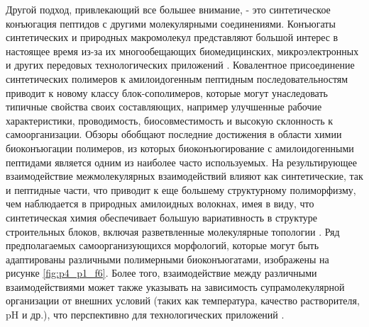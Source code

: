     Другой подход, привлекающий все большее внимание, - это синтетическое конъюгация пептидов с другими молекулярными соединениями. Конъюгаты синтетических и природных макромолекул представляют большой интерес в настоящее время из-за их многообещающих биомедицинских, микроэлектронных и других передовых технологических приложений \cite{borner_strategies_2009,lutz_modern_2008,borner_bioinspired_2007,vandermeulen_peptideprotein_2004,hardy_silk-inspired_2009,schlaad_block_2003}. Ковалентное присоединение синтетических полимеров к амилоидогенным пептидным последовательностям приводит к новому классу блок-сополимеров, которые могут унаследовать типичные свойства своих составляющих, например улучшенные рабочие характеристики, проводимость, биосовместимость и высокую склонность к самоорганизации. Обзоры \cite{borner_strategies_2009,lutz_modern_2008,borner_bioinspired_2007,vandermeulen_peptideprotein_2004} обобщают последние достижения в области химии биоконъюгации полимеров, из которых биоконъюгирование с амилоидогенными пептидами является одним из наиболее часто используемых. На результирующее взаимодействие межмолекулярных взаимодействий влияют как синтетические, так и пептидные части, что приводит к еще большему структурному полиморфизму, чем наблюдается в природных амилоидных волокнах, имея в виду, что синтетическая химия обеспечивает большую вариативность в структуре строительных блоков, включая разветвленные молекулярные топологии \cite{eckhardt_rational_2005}. Ряд предполагаемых самоорганизующихся морфологий, которые могут быть адаптированы различными полимерными биоконъюгатами, изображены на рисунке \ref{fig:p4_p1_f6}. Более того, взаимодействие между различными взаимодействиями может также указывать на зависимость супрамолекулярной организации от внешних условий (таких как температура, качество растворителя, pH и др.), что перспективно для технологических приложений \cite{ikkala_hierarchical_2004}.

